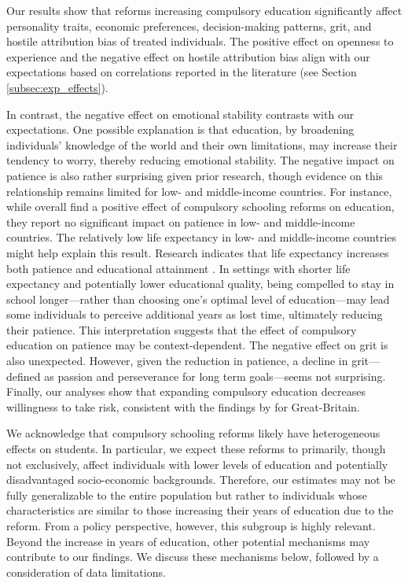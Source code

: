 Our results show that reforms increasing compulsory education significantly affect personality traits, economic preferences, decision-making patterns, grit, and hostile attribution bias of treated individuals. The positive effect on openness to experience and the negative effect on hostile attribution bias align with our expectations based on correlations reported in the literature (see Section \ref{subsec:exp_effects}).

In contrast, the negative effect on emotional stability contrasts with our expectations. One possible explanation is that education, by broadening individuals' knowledge of the world and their own limitations, may increase their tendency to worry, thereby reducing emotional stability. The negative impact on patience is also rather surprising given prior research, though evidence on this relationship remains limited for low- and middle-income countries. For instance, while \citet{dohmen_effect_2022} overall find a positive effect of compulsory schooling reforms on education, they report no significant impact on patience in low- and middle-income countries. The relatively low life expectancy in low- and middle-income countries might help explain this result. Research indicates that life expectancy increases both patience \parencite{becker_endogenous_1997, falk_longevity_2019} and educational attainment \parencite{ben-porath_production_1970, cervellati_life_2013}. In settings with shorter life expectancy and potentially lower educational quality, being compelled to stay in school longer---rather than choosing one's optimal level of education---may lead some individuals to perceive additional years as lost time, ultimately reducing their patience. This interpretation suggests that the effect of compulsory education on patience may be context-dependent.
The negative effect on grit is also unexpected. However, given the reduction in patience, a decline in grit---defined as passion and perseverance for long term goals---seems not surprising. Finally, our analyses show that expanding compulsory education decreases willingness to take risk, consistent with the findings by \citet{jung_does_2015} for Great-Britain.

We acknowledge that compulsory schooling reforms likely have heterogeneous effects on students. In particular, we expect these reforms to primarily, though not exclusively, affect individuals with lower levels of education and potentially disadvantaged socio-economic backgrounds. Therefore, our estimates may not be fully generalizable to the entire population but rather to individuals whose characteristics are similar to those increasing their years of education due to the reform. From a policy perspective, however, this subgroup is highly relevant. Beyond the increase in years of education, other potential mechanisms may contribute to our findings. We discuss these mechanisms below, followed by a consideration of data limitations.


